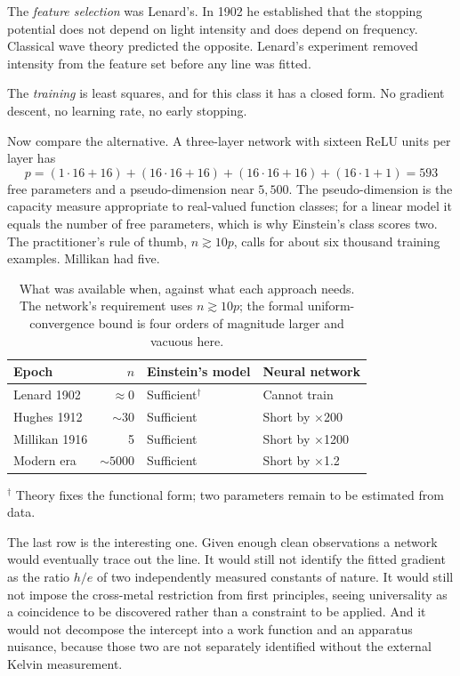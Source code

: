 \documentclass[11pt]{article}
\begin{document}
The \emph{feature selection} was Lenard's.  In 1902 he established that the
stopping potential does not depend on light intensity and does depend on
frequency.  Classical wave theory predicted the opposite.  Lenard's experiment
removed intensity from the feature set before any line was fitted.

The \emph{training} is least squares, and for this class it has a closed form.
No gradient descent, no learning rate, no early stopping.

Now compare the alternative.  A three-layer network with sixteen ReLU units
per layer has
\[
  p = (1\!\cdot\!16+16)+(16\!\cdot\!16+16)+(16\!\cdot\!16+16)+(16\!\cdot\!1+1)
    = 593
\]
free parameters and a pseudo-dimension near $5{,}500$.  The pseudo-dimension
is the capacity measure appropriate to real-valued function classes; for a
linear model it equals the number of free parameters, which is why Einstein's
class scores two.  The practitioner's rule of thumb, $n \gtrsim 10p$, calls for
about six thousand training examples.  Millikan had five.

\begin{table}[ht]
\centering
\caption{What was available when, against what each approach needs.  The
network's requirement uses $n \gtrsim 10p$; the formal uniform-convergence
bound is four orders of magnitude larger and vacuous here.}
\label{tab:complexity}
\medskip
\begin{tabular}{lrll}
\toprule
Epoch & $n$ & Einstein's model & Neural network \\
\midrule
Lenard 1902   & $\approx 0$ & Sufficient$^\dagger$ & Cannot train \\
Hughes 1912   & $\sim 30$   & Sufficient & Short by $\times$200 \\
Millikan 1916 & 5           & Sufficient & Short by $\times$1200 \\
Modern era    & $\sim 5000$ & Sufficient & Short by $\times$1.2 \\
\bottomrule
\end{tabular}

\smallskip
\begin{minipage}{0.85\textwidth}
\footnotesize $^\dagger$ Theory fixes the functional form; two parameters
remain to be estimated from data.
\end{minipage}
\end{table}

The last row is the interesting one.  Given enough clean observations a
network would eventually trace out the line.  It would still not identify the
fitted gradient as the ratio $h/e$ of two independently measured constants of
nature.  It would still not impose the cross-metal restriction from first
principles, seeing universality as a coincidence to be discovered rather than
a constraint to be applied.  And it would not decompose the intercept into a
work function and an apparatus nuisance, because those two are not separately
identified without the external Kelvin measurement.
\end{document}
